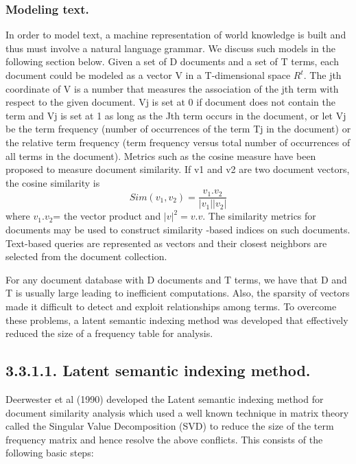 \documentclass{article}
\begin{document}
\subsubsection{ Modeling text.}
In order to model text, a machine representation of world knowledge is built and thus must involve a natural language grammar. We discuss such models in the following section below.
        Given a set of D documents and a set of T terms, each document could be modeled as a vector V in a T-dimensional space $R^{t}$. 
The jth coordinate of V is a number that measures the association of the jth term with respect to the given document. Vj is set at 0 if document does not contain the term and Vj is set at 1 as long as the Jth term occurs in the document, or let Vj be the term frequency (number of occurrences of the term Tj in the document) or the relative term frequency (term frequency versus total number of occurrences of all terms in the document).
Metrics such as the cosine measure have been proposed to measure document similarity. If v1 and v2 are two document vectors, the cosine similarity is    
\begin{equation}
Sim(v_{1},v_{2}) = \frac{v_{1}.v_{2}}{|v_{1}||v_{2}|} 
\end{equation} where $ v_{1}.v_{2}$= the vector product and $|v|^{2} = v.v.$
\newline The similarity metrics for documents may be used to construct similarity -based indices on such documents. Text-based queries are represented as vectors and their closest neighbors are selected from the document collection.

For any document database with D documents and T terms, we have that D and T is usually large leading to inefficient computations. Also, the sparsity of vectors made it difficult to detect and exploit relationships among terms. To overcome these problems, a latent semantic indexing method was developed that effectively reduced the size of a frequency table for analysis.
\subsection*{3.3.1.1. Latent semantic indexing method.}
Deerwester et al (1990) developed the Latent semantic indexing method for document similarity analysis which used a well known technique in matrix theory called the Singular Value Decomposition (SVD) to reduce the size of the term frequency matrix and hence resolve the above conflicts. 
This consists of the following basic steps: 
\end{document}
